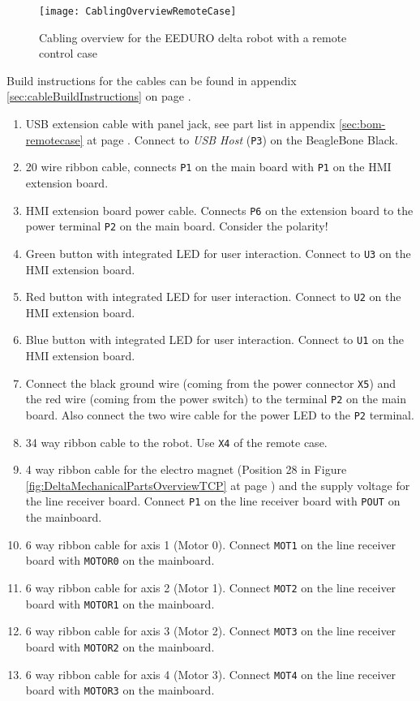 \begin{figure}[htbp]
	\centering
	\texttt{[image: CablingOverviewRemoteCase]}
	\caption{Cabling overview for the EEDURO delta robot with a remote control case}
	\label{fig:CablingOverviewRemoteCase}
\end{figure}

Build instructions for the cables can be found in appendix \ref{sec:cableBuildInstructions} on page \pageref{sec:cableBuildInstructions}.

\begin{enumerate}[(1)]
	\item USB extension cable with panel jack, see part list in appendix \ref{sec:bom-remotecase} at page \pageref{sec:bom-remotecase}. Connect to \textit{USB Host} (\texttt{P3}) on the BeagleBone Black.
	\item 20 wire ribbon cable, connects \texttt{P1} on the main board with \texttt{P1} on the HMI extension board. 
	\item HMI extension board power cable. Connects \texttt{P6} on the extension board to the power terminal \texttt{P2} on the main board. Consider the polarity!
	\item Green button with integrated LED for user interaction. Connect to \texttt{U3} on the HMI extension board.
	\item Red button with integrated LED for user interaction. Connect to \texttt{U2} on the HMI extension board.
	\item Blue button with integrated LED for user interaction. Connect to \texttt{U1} on the HMI extension board.
	\item Connect the black ground wire (coming from the power connector \texttt{X5}) and the red wire (coming from the power switch) to the terminal \texttt{P2} on the main board. Also connect the two wire cable for the power LED to the \texttt{P2} terminal.
	\item 34 way ribbon cable to the robot. Use \texttt{X4} of the remote case.
	\item 4 way ribbon cable for the electro magnet (Position 28 in Figure \ref{fig:DeltaMechanicalPartsOverviewTCP} at page \pageref{fig:DeltaMechanicalPartsOverviewTCP}) and the supply voltage for the line receiver board. Connect \texttt{P1} on the line receiver board with \texttt{POUT} on the mainboard.
	\item 6 way ribbon cable for axis 1 (Motor 0). Connect \texttt{MOT1} on the line receiver board with \texttt{MOTOR0} on the mainboard.
	\item 6 way ribbon cable for axis 2 (Motor 1). Connect \texttt{MOT2} on the line receiver board with \texttt{MOTOR1} on the mainboard.
	\item 6 way ribbon cable for axis 3 (Motor 2). Connect \texttt{MOT3} on the line receiver board with \texttt{MOTOR2} on the mainboard.
	\item 6 way ribbon cable for axis 4 (Motor 3). Connect \texttt{MOT4} on the line receiver board with \texttt{MOTOR3} on the mainboard.
\end{enumerate}

